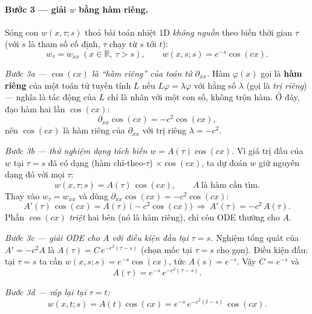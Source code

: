 \paragraph{Bước 3 --- giải $w$ bằng hàm riêng.}\leavevmode

Sóng con $w(x,\tau;s)$ thoả bài toán nhiệt 1D \emph{không nguồn} theo biến thời gian $\tau$ (với $s$ là tham số cố định, $\tau$ chạy từ $s$ tới $t$):
\[
  w_\tau=w_{xx}\ (x\in\mathbb{R},\ \tau>s),\qquad w(x,s;s)=e^{-s}\cos(cx).
\]

\emph{Bước 3a --- $\cos(cx)$ là ``hàm riêng'' của toán tử $\partial_{xx}$.} Hàm $\varphi(x)$ gọi là \textbf{hàm riêng} của một toán tử tuyến tính $L$ nếu $L\varphi=\lambda\varphi$ với hằng số $\lambda$ (gọi là \emph{trị riêng}) --- nghĩa là tác động của $L$ chỉ là nhân với một con số, không trộn hàm. Ở đây, đạo hàm hai lần $\cos(cx)$:
\[
  \partial_{xx}\cos(cx)=-c^2\cos(cx),
\]
nên $\cos(cx)$ là hàm riêng của $\partial_{xx}$ với trị riêng $\lambda=-c^2$.

\emph{Bước 3b --- thử nghiệm dạng tách biến $w=A(\tau)\cos(cx)$.} Vì giá trị đầu của $w$ tại $\tau=s$ đã có dạng (hàm chỉ-theo-$\tau$) $\times\cos(cx)$, ta dự đoán $w$ giữ nguyên dạng đó với mọi $\tau$:
\[
  w(x,\tau;s)=A(\tau)\,\cos(cx),\qquad A\ \text{là hàm cần tìm}.
\]
Thay vào $w_\tau=w_{xx}$ và dùng $\partial_{xx}\cos(cx)=-c^2\cos(cx)$:
\[
  A'(\tau)\,\cos(cx)=A(\tau)\,\big(-c^2\cos(cx)\big)\ \Longrightarrow\ A'(\tau)=-c^2\,A(\tau).
\]
Phần $\cos(cx)$ \emph{triệt} hai bên (nó là hàm riêng), chỉ còn ODE thường cho $A$.

\emph{Bước 3c --- giải ODE cho $A$ với điều kiện đầu tại $\tau=s$.} Nghiệm tổng quát của $A'=-c^2 A$ là $A(\tau)=C\,e^{-c^2(\tau-s)}$ (chọn mốc tại $\tau=s$ cho gọn). Điều kiện đầu: tại $\tau=s$ ta cần $w(x,s;s)=e^{-s}\cos(cx)$, tức $A(s)=e^{-s}$. Vậy $C=e^{-s}$ và
\[
  A(\tau)=e^{-s}\,e^{-c^2(\tau-s)}.
\]

\emph{Bước 3d --- ráp lại tại $\tau=t$:}
\[
  w(x,t;s)=A(t)\cos(cx)=e^{-s}\,e^{-c^2(t-s)}\,\cos(cx).
\]

